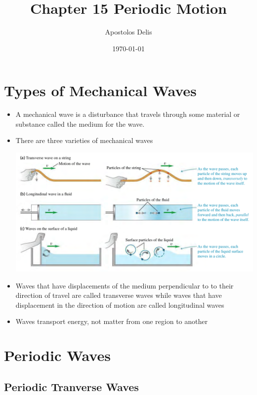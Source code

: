 \documentclass[11pt, a4paper]{article}
\begin{document}
\title{Chapter 15 Periodic Motion}
\author{Apostolos Delis}
\date{\today}
\maketitle

\tableofcontents
\section[15.1, Types of Mechanical Wabves]{Types of Mechanical Waves}
\begin{itemize}
    \item A mechanical wave is a disturbance that travels through some material or
        substance called the medium for the wave.
    \item There are three varieties of mechanical waves

\includegraphics[scale=0.65]{images/mech_waves.png}

    \item Waves that have displacements of the medium perpendicular to to their direction
        of travel are called transverse waves while waves that have displacement in
        the direction of motion are called longitudinal waves
    \item Waves transport energy, not matter from one region to another
\end{itemize}

\section[15.2, Periodic Waves]{Periodic Waves}

\subsection{Periodic Tranverse Waves}
\end{document}
